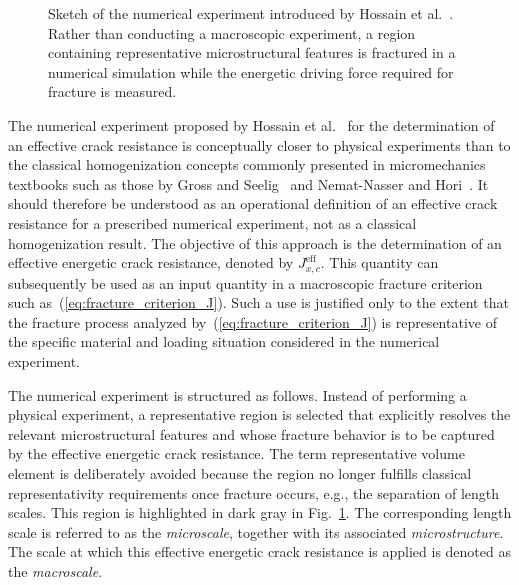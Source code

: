 \documentclass[pdflatex,sn-mathphys-num]{sn-jnl}%
\theoremstyle{thmstyleone}%
\theoremstyle{thmstyletwo}%
\theoremstyle{thmstylethree}%
\begin{document}

\begin{figure}[htb]
    \centering
    \resizebox{0.6\textwidth}{!}{}
    \caption{%
        Sketch of the numerical experiment introduced by Hossain et al.~\cite{hossain_effective_2014}. 
        Rather than conducting a macroscopic experiment, a region containing representative microstructural features is fractured in a numerical simulation while the energetic driving force required for fracture is measured.
    }
    \label{fig:numerical_experiment}
\end{figure}

The numerical experiment proposed by Hossain et al.~\cite{hossain_effective_2014} for the determination of an effective crack resistance is conceptually closer to physical experiments than to the classical homogenization concepts commonly presented in micromechanics textbooks such as those by Gross and Seelig~\cite{gross_fracture_2011} and Nemat-Nasser and Hori~\cite{nemat-nasser_micromechanics_2013}. 
It should therefore be understood as an operational definition of an effective crack resistance for a prescribed numerical experiment, not as a classical homogenization result.
The objective of this approach is the determination of an effective energetic crack resistance, denoted by $J_{x,c}^{\text{eff}}$. This quantity can subsequently be used as an input quantity in a macroscopic fracture criterion such as~(\ref{eq:fracture_criterion_J}).
Such a use is justified only to the extent that the fracture process analyzed by~(\ref{eq:fracture_criterion_J}) is representative of the specific material and loading situation considered in the numerical experiment.

The numerical experiment is structured as follows.
Instead of performing a physical experiment, a representative region
 is selected that explicitly resolves the relevant microstructural features and whose fracture behavior is to be captured by the effective energetic crack resistance.
The term representative volume element is deliberately avoided because the region no longer fulfills classical representativity requirements once fracture occurs, e.g., the separation of length scales.
This region is highlighted in dark gray in Fig.~\ref{fig:numerical_experiment}.
The corresponding length scale is referred to as the \textsl{microscale}, together with its associated \textsl{microstructure}.
The scale at which this effective energetic crack resistance is applied is denoted as the \textsl{macroscale}.
\end{document}
